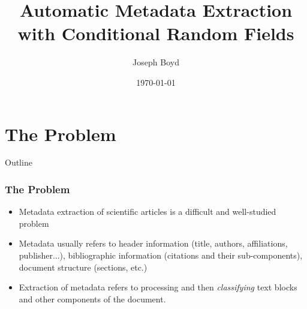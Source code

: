 \documentclass{beamer}
\title[Automatic Metadata Extraction]{Automatic Metadata Extraction with Conditional Random Fields} %
\author{Joseph Boyd} %
\institute[EPFL] %
{
\'Ecole Polytechnique F\'eq\'erale de Lausanne \\ %
\medskip
\textit{joseph.boyd@epfl.ch} %
}
\date{\today} %
\begin{document}
\begin{frame}
\titlepage %
\end{frame}


\section{The Problem}
\begin{frame}[noframenumbering]{Outline}
\end{frame}


\begin{frame}
\frametitle{The Problem}
\begin{itemize}
\item Metadata extraction of scientific articles is a difficult and well-studied problem
\item Metadata usually refers to header information (title, authors, affiliations, publisher...), bibliographic information (citations and their sub-components), document structure (sections, etc.)
\item Extraction of metadata refers to processing and then \emph{classifying} text blocks and other components of the document.
\end{itemize}
\end{frame}
\end{document}

